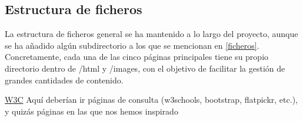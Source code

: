 \documentclass[11pt, a4paper]{book}
\begin{document}
	
	\subsection{Estructura de ficheros}
	La estructura de ficheros general se ha mantenido a lo largo del proyecto, aunque se ha añadido algún subdirectorio a los que se mencionan en \ref{ficheros}. Concretamente, cada una de las cinco páginas principales tiene su propio directorio dentro de /html y /images, con el objetivo de facilitar la gestión de grandes cantidades de contenido.
	
	
	
	\begin{thebibliography}{widestlabel}
		\href{https://html.spec.whatwg.org/multipage/}{W3C}
		Aquí deberían ir páginas de consulta (w3schools, bootstrap, flatpickr, etc.), y quizás páginas en las que nos hemos inspirado
	\end{thebibliography}
	
	
	
\end{document}
